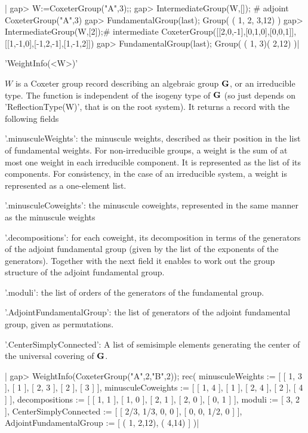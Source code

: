 |    gap> W:=CoxeterGroup("A",3);;
    gap> IntermediateGroup(W,[]); # adjoint
    CoxeterGroup("A",3)
    gap> FundamentalGroup(last);
    Group( ( 1, 2, 3,12) )
    gap> IntermediateGroup(W,[2]);# intermediate
    CoxeterGroup([[2,0,-1],[0,1,0],[0,0,1]],[[1,-1,0],[-1,2,-1],[1,-1,2]])
    gap> FundamentalGroup(last);
    Group( ( 1, 3)( 2,12) )|


'WeightInfo(<W>)'

$W$  is a Coxeter group  record describing an algebraic  group ${\mathbf G}$, or an
irreducible  type. The function is independent of the isogeny type of ${\mathbf G}$
(so  just depends on  'ReflectionType(W)', that is  on the root system). It
returns a record with the following fields\:

'.minusculeWeights': the minuscule weights, described as their position in
   the list of fundamental weights. For non-irreducible groups, a weight is
   the  sum of  at most  one weight  in each  irreducible component.  It is
   represented  as the list of its components. For consistency, in the case
   of an irreducible system, a weight is represented as a one-element list.

'.minusculeCoweights': the minuscule coweights, represented in the same
   manner as the minuscule weights

'.decompositions': for each coweight, its decomposition in terms of the
   generators  of the adjoint  fundamental group (given  by the list of the
   exponents of the generators). Together with the next field it enables to
   work out the group structure of the adjoint fundamental group.

'.moduli': the list of orders of the generators of the fundamental group.

'.AdjointFundamentalGroup': the list of generators of the adjoint fundamental
   group, given as permutations.

'.CenterSimplyConnected': A list of semisimple elements generating the center
   of the universal covering of ${\mathbf G}$.

|    gap> WeightInfo(CoxeterGroup("A",2,"B",2));
    rec(
      minusculeWeights := [ [ 1, 3 ], [ 1 ], [ 2, 3 ], [ 2 ], [ 3 ] ],
      minusculeCoweights := [ [ 1, 4 ], [ 1 ], [ 2, 4 ], [ 2 ], [ 4 ] ],
      decompositions := [ [ 1, 1 ], [ 1, 0 ], [ 2, 1 ], [ 2, 0 ], [ 0, 1 ] ],
      moduli := [ 3, 2 ],
      CenterSimplyConnected := [ [ 2/3, 1/3, 0, 0 ], [ 0, 0, 1/2, 0 ] ],
      AdjointFundamentalGroup := [ ( 1, 2,12), ( 4,14) ] )|

